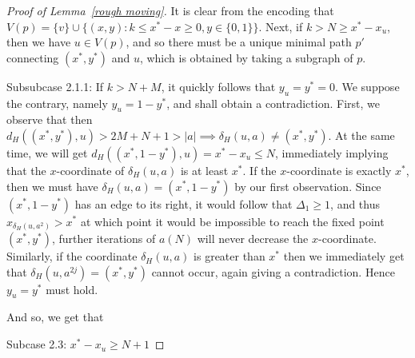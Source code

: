 \documentclass[a4paper]{article}
\theoremstyle{definition}
\begin{document}
\begin{proof}[Proof of Lemma~\ref*{rough moving}]
{    It is clear from the encoding that $V(p) = \{v\} \cup \{(x,y):k\le x^*-x\ge 0, y\in \{0,1\}\}$. Next, if $k > N\ge x^*-x_u$, then we have $u\in V(p)$, and so there must be a unique minimal path $p'$ connecting $(x^*,y^*)$ and $u$, which is obtained by taking a subgraph of $p$.
    
    Subsubcase 2.1.1: If $k> N+M$, it quickly follows that $y_u = y^* = 0$. We suppose the contrary, namely $y_u = 1-y^*$, and shall obtain a contradiction. First, we observe that then $d_H((x^*,y^*),u) > 2M+N+1>|a| \implies \delta_H(u,a) \neq (x^*,y^*)$. At the same time, we will get $d_H((x^*,1-y^*),u) = x^*-x_u \le N$, immediately implying that the $x$-coordinate of $\delta_H(u,a)$ is at least $x^*$. If the $x$-coordinate is exactly $x^*$, then we must have $\delta_H(u,a) = (x^*,1-y^*)$ by our first observation. Since $(x^*,1-y^*)$ has an edge to its right, it would follow that $\Delta_1 \ge 1$, and thus $x_{\delta_H(u,a^2)}> x^*$ at which point it would be impossible to reach the fixed point $(x^*,y^*)$, further iterations of $a(N)$ will never decrease the $x$-coordinate. Similarly, if the coordinate $\delta_H(u,a)$ is greater than $x^*$ then we immediately get that $\delta_H(u,a^{2j})= (x^*,y^*)$ cannot occur, again giving a contradiction. Hence $y_u = y^*$ must hold.
    
    And so, we get that
    

    Subcase 2.3: $x^*-x_u\ge N+1$
    }
 
\end{proof}
\end{document}
